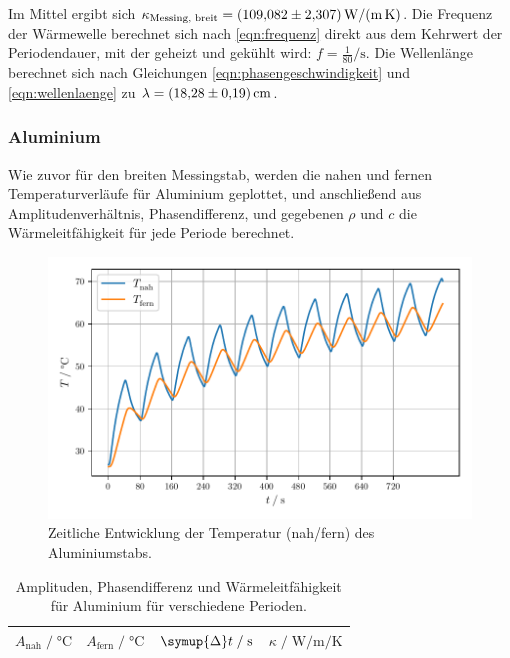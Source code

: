 Im Mittel ergibt sich $\kappa_\text{Messing, breit} = \SI{109.082 \pm 2.307}{\watt\per\meter\per\kelvin}$.
Die Frequenz der Wärmewelle berechnet sich nach \autoref{eqn:frequenz} direkt aus dem Kehrwert der Periodendauer,
mit der geheizt und gekühlt wird: $f = \frac{1}{80} \si{\per\second}$.
Die Wellenlänge berechnet sich nach Gleichungen \eqref{eqn:phasengeschwindigkeit} und \eqref{eqn:wellenlaenge} zu $\lambda = \SI{18.28 \pm 0.19}{\centi\meter}$.


\subsubsection{Aluminium}

Wie zuvor für den breiten Messingstab,
werden die nahen und fernen Temperaturverläufe für Aluminium geplottet,
und anschließend aus Amplitudenverhältnis, Phasendifferenz, und gegebenen $\rho$ und $c$
die Wärmeleitfähigkeit für jede Periode berechnet.

\begin{figure}[H]
  \centering
  \includegraphics{build/plot_dynamisch_aluminium.pdf}
  \caption{Zeitliche Entwicklung der Temperatur (nah/fern) des Aluminiumstabs.}
  \label{fig:dynamisch_aluminium}
\end{figure}

\begin{table}[H]
     \centering
     \caption{Amplituden, Phasendifferenz und Wärmeleitfähigkeit für Aluminium für verschiedene Perioden.}
     \label{tab:aluminium}
     \begin{tabular}{c c c c}
      \toprule
      $A_\text{nah} \;/\; \si{\celsius}$ &
      $A_\text{fern} \;/\; \si{\celsius}$ &
      $\symup{\Delta}t \;/\; \si{\second}$ &
      $\kappa \;/\; \si{\watt\per\meter\per\kelvin}$ \\
      \midrule
      
      \bottomrule
     \end{tabular}
\end{table}

